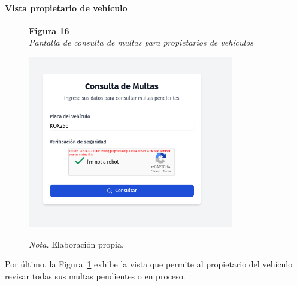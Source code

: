  \paragraph{Vista propietario de vehículo}
 \begin{figure}[htbp]
    \begin{flushleft}
        \textbf{Figura 16}\\[2em]
        \textit{Pantalla de consulta de multas para propietarios de vehículos}
    \end{flushleft}
    \vspace{1em}
    \centering
    \includegraphics[width=0.8\textwidth]{Images/UI5.png}
    \vspace{2em}
    \begin{flushleft}
        \textit{Nota.} Elaboración propia.
    \end{flushleft}
    \label{fig:consulta_multas_propietario}
\end{figure}
Por último, la Figura~\ref{fig:consulta_multas_propietario} exhibe la vista que permite al propietario del vehículo revisar todas sus multas pendientes o en proceso. 
